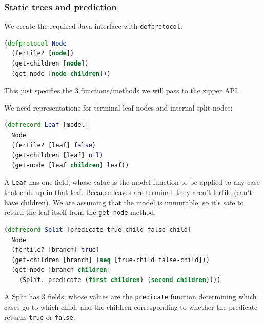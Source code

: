 \documentclass[11pt,openany,american,usenames,dvipsnames,svgnames,x11names,table,isodate]{article}
\numberwithin{equation}{section}
\numberwithin{figure}{section}
\begin{document}
\subsubsection{Static trees and prediction}

We create the required Java interface with \texttt{defprotocol}:

\begin{minipage}[t]{1\columnwidth}%
\begin{lstlisting}[caption={Tree node protocol},label={lis:node-protocol},language=clojure,tabsize=2]
(defprotocol Node
  (fertile? [node])
  (get-children [node])
  (get-node [node children])) 
\end{lstlisting}
%
\end{minipage}

This just specifies the 3 functions/methods we will pass to the zipper
API. 

We need representations for terminal leaf nodes and internal split
nodes:

\begin{minipage}[t]{1\columnwidth}%
\begin{lstlisting}[caption={Leaf nodes},label={lis:leaf-defrecord},language=clojure,tabsize=2]
(defrecord Leaf [model]
  Node
  (fertile? [leaf] false)
  (get-children [leaf] nil)
  (get-node [leaf children] leaf)) 
\end{lstlisting}
%
\end{minipage}

A \texttt{Leaf} has one field, whose value is the model function to
be applied to any case that ends up in that leaf. Because leaves are
terminal, they aren't fertile (can't have children). We are assuming
that the model is immutable, so it's safe to return the leaf itself
from the \texttt{get-node} method. 

\begin{minipage}[t]{1\columnwidth}%
\begin{lstlisting}[caption={Split nodes},label={lis:split-defrecord},language=clojure,tabsize=2]
(defrecord Split [predicate true-child false-child]
  Node
  (fertile? [branch] true)
  (get-children [branch] (seq [true-child false-child]))
  (get-node [branch children] 
    (Split. predicate (first children) (second children)))) 
\end{lstlisting}
%
\end{minipage}

A Split has 3 fields, whose values are the \texttt{predicate} function
determining which cases go to which child, and the children corresponding
to whether the predicate returns \texttt{true} or \texttt{false}. 
\end{document}
